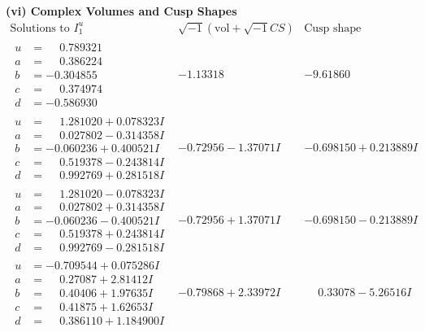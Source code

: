 \documentclass[1p]{elsarticle_modified}
\theoremstyle{definition}
\newcommand{\I}{\sqrt{-1}}
\begin{document}
\newpage\flushleft \textbf{(vi) Complex Volumes and Cusp Shapes}
$$\begin{array}{c|c|c}  
\text{Solutions to }I^u_{1}& \I (\text{vol} + \sqrt{-1}CS) & \text{Cusp shape}\\
 \hline 
\begin{aligned}
u &= \phantom{-}0.789321\phantom{ +0.000000I} \\
a &= \phantom{-}0.386224\phantom{ +0.000000I} \\
b &= -0.304855\phantom{ +0.000000I} \\
c &= \phantom{-}0.374974\phantom{ +0.000000I} \\
d &= -0.586930\phantom{ +0.000000I}\end{aligned}
 & -1.13318\phantom{ +0.000000I} & -9.61860\phantom{ +0.000000I} \\ \hline\begin{aligned}
u &= \phantom{-}1.281020 + 0.078323 I \\
a &= \phantom{-}0.027802 - 0.314358 I \\
b &= -0.060236 + 0.400521 I \\
c &= \phantom{-}0.519378 - 0.243814 I \\
d &= \phantom{-}0.992769 + 0.281518 I\end{aligned}
 & -0.72956 - 1.37071 I & -0.698150 + 0.213889 I \\ \hline\begin{aligned}
u &= \phantom{-}1.281020 - 0.078323 I \\
a &= \phantom{-}0.027802 + 0.314358 I \\
b &= -0.060236 - 0.400521 I \\
c &= \phantom{-}0.519378 + 0.243814 I \\
d &= \phantom{-}0.992769 - 0.281518 I\end{aligned}
 & -0.72956 + 1.37071 I & -0.698150 - 0.213889 I \\ \hline\begin{aligned}
u &= -0.709544 + 0.075286 I \\
a &= \phantom{-}0.27087 + 2.81412 I \\
b &= \phantom{-}0.40406 + 1.97635 I \\
c &= \phantom{-}0.41875 + 1.62653 I \\
d &= \phantom{-}0.386110 + 1.184900 I\end{aligned}
 & -0.79868 + 2.33972 I & \phantom{-}0.33078 - 5.26516 I \\ \hline\begin{aligned}

\end{aligned}
\end{array}$$
\end{document}
